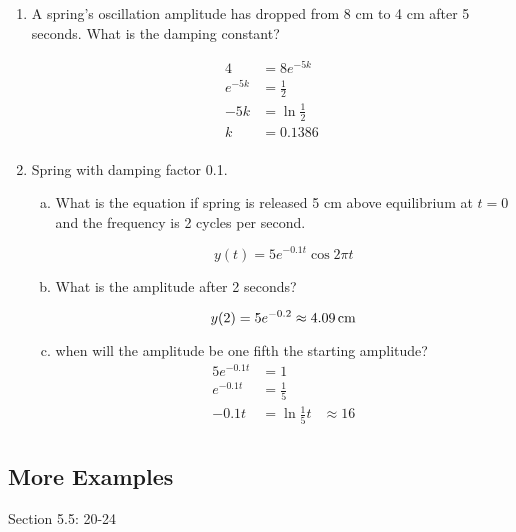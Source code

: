\documentclass{exam}
\begin{document}
  \begin{enumerate}
    \item A spring's oscillation amplitude has dropped from 8 cm to 4 cm after 5 seconds.  What is the damping constant?
      \begin{solution}
        \begin{align*}
          4       & = 8 e^{-5k} \\
          e^{-5k} & = \frac{1}{2} \\
          -5k     & = \ln \frac{1}{2} \\
          k       & = 0.1386 \\
        \end{align*}
      \end{solution}

    \item Spring with damping factor 0.1.
      \begin{enumerate}[(a)]
        \item What is the equation if spring is released 5 cm above equilibrium at $t = 0$ and the frequency is 2 cycles
          per second.

          \begin{solution}
            \[
              y(t) = 5 e^{-0.1 t} \cos 2 \pi t
            \]
          \end{solution}

        \item What is the amplitude after 2 seconds?
          \begin{solution}
            \[
              y(2) = 5 e^{-0.2} \approx \unit[4.09]{cm}
            \]
          \end{solution}

        \item when will the amplitude be one fifth the starting amplitude?
          \begin{align*}
            5 e^{-0.1 t} & = 1 \\
            e^{-0.1 t}   & = \frac{1}{5} \\
            -0.1 t       & = \ln \frac{1}{5}
            t            & \approx 16 \\
          \end{align*}
      \end{enumerate}
  \end{enumerate}

  \subsection{More Examples}
  Section 5.5: 20-24
\end{document}
